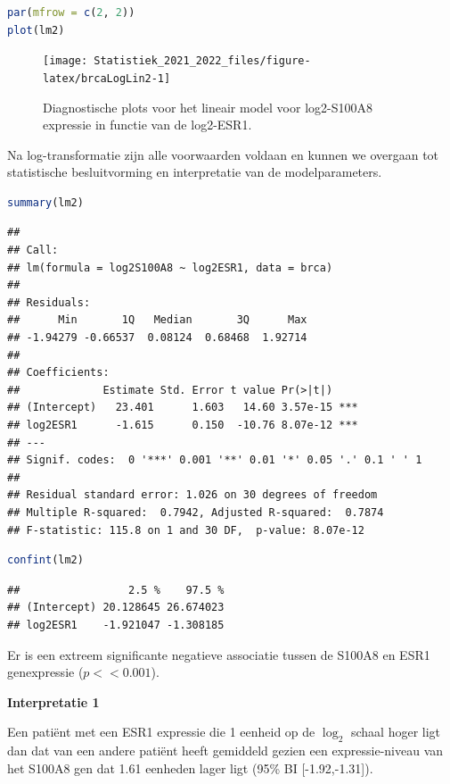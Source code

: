 \documentclass[
  12pt,dutch,coursenotes]{book}
\theoremstyle{definition}
\theoremstyle{definition}
\theoremstyle{definition}
\theoremstyle{definition}
\theoremstyle{remark}
\begin{document}
\begin{lstlisting}[language=R]
par(mfrow = c(2, 2))
plot(lm2)
\end{lstlisting}

\begin{figure}

{\centering \texttt{[image: Statistiek\_2021\_2022\_files/figure-latex/brcaLogLin2-1]} 

}

\caption{Diagnostische plots voor het lineair model voor log2-S100A8 expressie in functie van de log2-ESR1.}\label{fig:brcaLogLin2}
\end{figure}

Na log-transformatie zijn alle voorwaarden voldaan en kunnen we overgaan tot statistische besluitvorming en interpretatie van de modelparameters.

\begin{lstlisting}[language=R]
summary(lm2)
\end{lstlisting}

\begin{lstlisting}
## 
## Call:
## lm(formula = log2S100A8 ~ log2ESR1, data = brca)
## 
## Residuals:
##      Min       1Q   Median       3Q      Max 
## -1.94279 -0.66537  0.08124  0.68468  1.92714 
## 
## Coefficients:
##             Estimate Std. Error t value Pr(>|t|)    
## (Intercept)   23.401      1.603   14.60 3.57e-15 ***
## log2ESR1      -1.615      0.150  -10.76 8.07e-12 ***
## ---
## Signif. codes:  0 '***' 0.001 '**' 0.01 '*' 0.05 '.' 0.1 ' ' 1
## 
## Residual standard error: 1.026 on 30 degrees of freedom
## Multiple R-squared:  0.7942, Adjusted R-squared:  0.7874 
## F-statistic: 115.8 on 1 and 30 DF,  p-value: 8.07e-12
\end{lstlisting}

\begin{lstlisting}[language=R]
confint(lm2)
\end{lstlisting}

\begin{lstlisting}
##                 2.5 %    97.5 %
## (Intercept) 20.128645 26.674023
## log2ESR1    -1.921047 -1.308185
\end{lstlisting}

Er is een extreem significante negatieve associatie tussen de S100A8 en ESR1 genexpressie (\(p<<0.001\)).

\textbf{Interpretatie 1}

Een patiënt met een ESR1 expressie die 1 eenheid op de \(\log_2\) schaal hoger ligt dan dat van een andere patiënt heeft gemiddeld gezien een expressie-niveau van het S100A8 gen dat 1.61 eenheden lager ligt (95\% BI {[}-1.92,-1.31{]}).
\end{document}
